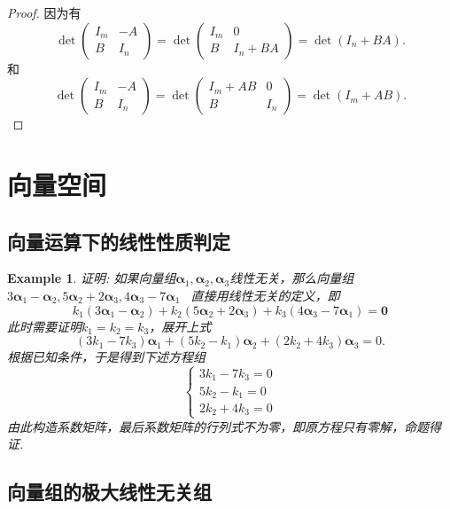 \documentclass{article}
\newtheorem{example}[theorem]{Example}
\newcommand{\hints}{{\color{blue} \text{hints}}}
\newcommand{\mbf}[1]{\bm{#1}}
\begin{document}
\begin{proof}
因为有
$$
\det\begin{pmatrix} I_m & -A \\ B & I_n \end{pmatrix} 
  = \det\begin{pmatrix} I_m & 0 \\ B & I_n + BA \end{pmatrix} = \det(I_n + BA).
$$
和
$$
\det\begin{pmatrix} I_m & -A \\ B & I_n \end{pmatrix} 
  = \det\begin{pmatrix} I_m+AB & 0 \\ B & I_n  \end{pmatrix} = \det(I_m + AB).
$$
\end{proof}



\newpage
\section{向量空间}

\subsection{向量运算下的线性性质判定}

\begin{example}
\rm 证明: 如果向量组$\mbf{\alpha}_1,\mbf{\alpha}_2,\mbf{\alpha}_3$线性无关，那么向量组$3\mbf{\alpha}_1-\mbf{\alpha}_2,5\mbf{\alpha}_2 + 2\mbf{\alpha}_3, 4\mbf{\alpha}_3-7\mbf{\alpha}_1$
\hints\ 直接用线性无关的定义，即
$$
k_1(3\mbf{\alpha}_1-\mbf{\alpha}_2) + k_2(5\mbf{\alpha}_2 + 2\mbf{\alpha}_3)+ k_3(4\mbf{\alpha}_3-7\mbf{\alpha}_1) = \mbf{0}
$$
此时需要证明$k_1 = k_2 = k_3$，展开上式
$$
(3k_1-7k_3)\mbf{\alpha}_1 + (5k_2 - k_1)\mbf{\alpha}_2 + (2k_2 +4k_3)\mbf{\alpha}_3 = 0. 
$$
根据已知条件，于是得到下述方程组
$$
\left \{
\begin{array}{ll}
3k_1-7k_3  = 0 \\
5k_2 - k_1 = 0 \\
2k_2 +4k_3 = 0
\end{array} \right.
$$
由此构造系数矩阵，最后系数矩阵的行列式不为零，即原方程只有零解，命题得证. 
\end{example}

\subsection{向量组的极大线性无关组}
\end{document}
